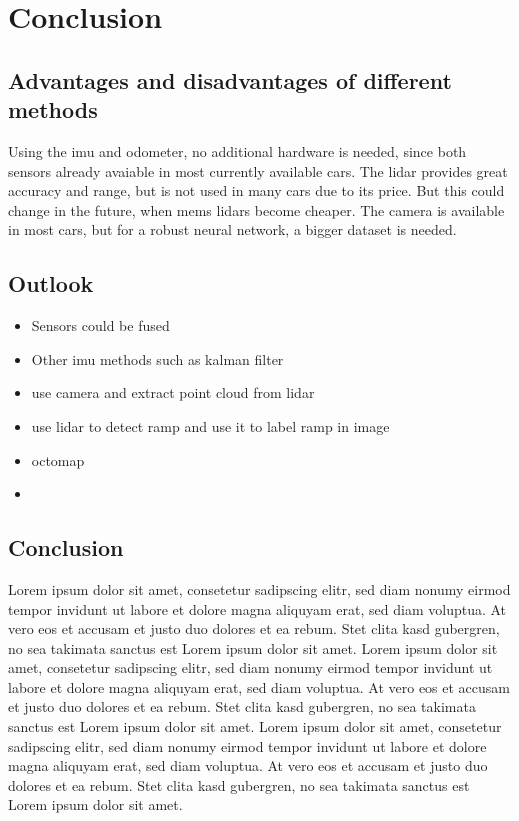 \chapter{Conclusion}
\label{ch:Conclusion}
\section{Advantages and disadvantages of different methods}
Using the \gls{imu} and odometer, no additional hardware is needed, since both sensors already avaiable in most currently available cars.
The \gls{lidar} provides great accuracy and range, but is not used in many cars due to its price.
But this could change in the future, when \gls{mems} \glspl{lidar} become cheaper.
The camera is available in most cars, but for a robust neural network, a bigger dataset is needed.

\section{Outlook}
\begin{itemize}
    \item Sensors could be fused
    \item Other \gls{imu} methods such as kalman filter
    \item use camera and extract point cloud from \gls{lidar}
    \item use \gls{lidar} to detect ramp and use it to label ramp in image
    \item octomap
    \item
\end{itemize}


\section{Conclusion}
Lorem ipsum dolor sit amet, consetetur sadipscing elitr, sed diam nonumy eirmod tempor invidunt ut labore et dolore magna aliquyam erat, sed diam voluptua. At vero eos et accusam et justo duo dolores et ea rebum. Stet clita kasd gubergren, no sea takimata sanctus est Lorem ipsum dolor sit amet. Lorem ipsum dolor sit amet, consetetur sadipscing elitr, sed diam nonumy eirmod tempor invidunt ut labore et dolore magna aliquyam erat, sed diam voluptua. At vero eos et accusam et justo duo dolores et ea rebum. Stet clita kasd gubergren, no sea takimata sanctus est Lorem ipsum dolor sit amet. Lorem ipsum dolor sit amet, consetetur sadipscing elitr, sed diam nonumy eirmod tempor invidunt ut labore et dolore magna aliquyam erat, sed diam voluptua. At vero eos et accusam et justo duo dolores et ea rebum. Stet clita kasd gubergren, no sea takimata sanctus est Lorem ipsum dolor sit amet.
